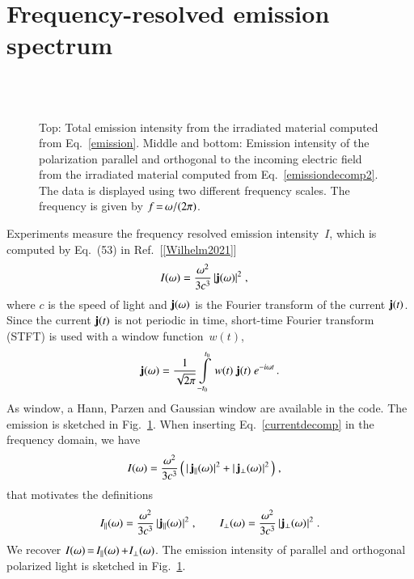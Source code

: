 \documentclass[11pt, a4paper]{scrartcl}
\newlength\figureheight
\newlength\figurewidth
\begin{document}
\section{Frequency-resolved emission spectrum}
\begin{figure}
\centering
\setlength\figureheight{7.0cm} 
\setlength{}

\\[1.0em]

\\[1.0em]
%

\caption{Top: Total emission intensity from the irradiated material computed from Eq.~\eqref{emission}. 
%
Middle and bottom: Emission intensity of the polarization parallel and orthogonal to the incoming electric field from the irradiated material computed from Eq.~\eqref{emissiondecomp2}.
%
The data is displayed using two different frequency scales. 
%
The frequency is given by $f\,{=}\,\omega/(2\pi)$.
}
    \label{fig:emission}
\end{figure}

Experiments measure the  frequency resolved emission intensity~$I$, which is computed by Eq.~(53) in Ref.~[\ref{Wilhelm2021}]
\begin{align}
I(\omega) &=
\frac{\omega^2}{3c^3}\,|\mathbf{j}(\omega)|^2\;, \label{emission}
\end{align}
where $c$ is the speed of light and $\mathbf{j}(\omega)$ is the Fourier transform of the current $\mathbf{j}(t)$.
%
Since the current $\mathbf{j}(t)$ is not periodic in time, short-time Fourier transform (STFT) is used with a window function~$w(t)$,
\begin{align}
    \mathbf{j}(\omega) = \frac{1}{\sqrt{2\pi}}\int\limits_{-t_0}^{t_0}\,w(t)\;\mathbf{j}(t)\;e^{-i\omega t}\,.
\end{align}
%
As window, a Hann, Parzen and Gaussian window are available in the code. 
%
The emission is sketched in Fig.~\ref{fig:emission}.
%
%
When inserting Eq.~\eqref{currentdecomp} in the frequency domain, we have
\begin{align}
I(\omega) &=
\frac{\omega^2}{3c^3}\,\Big(\,|\,\mathbf{j}_\parallel(\omega)\hspace{0.05em}|^2
+ |\,\mathbf{j}_\bot(\omega)\hspace{0.05em}|^2 \,\Big)
\;, \label{emissiondecomp}
\end{align}
that motivates the definitions
\begin{align}
I_\parallel(\omega) =
\frac{\omega^2}{3c^3}\, |\hspace{0.05em}\mathbf{j}_\parallel(\omega)\hspace{0.05em}|^2\;,
\hspace{2em}
I_\bot(\omega) =
\frac{\omega^2}{3c^3}\, |\hspace{0.05em}\mathbf{j}_\bot(\omega)\hspace{0.05em}|^2\;. \label{emissiondecomp2}
\end{align}
We recover $I(\omega)\,{=}\, I_\parallel(\omega)\,{+}\hspace{0.05em} I_\bot(\omega)$.
%
The emission intensity of parallel and orthogonal polarized light is sketched in Fig.~\ref{fig:emission}.
\end{document}

